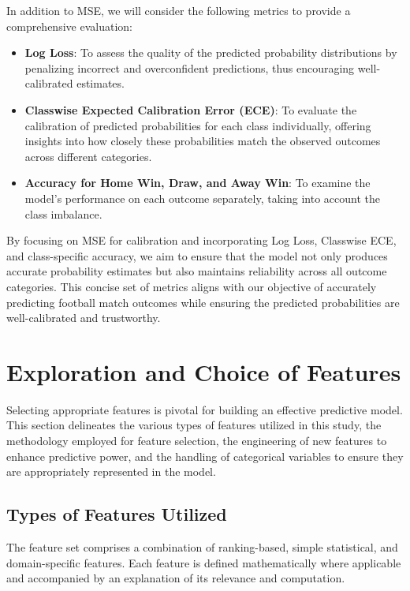 In addition to MSE, we will consider the following metrics to provide a comprehensive evaluation:

\begin{itemize}
    \item \textbf{Log Loss}: To assess the quality of the predicted probability distributions by penalizing incorrect and overconfident predictions, thus encouraging well-calibrated estimates.
    \item \textbf{Classwise Expected Calibration Error (ECE)}: To evaluate the calibration of predicted probabilities for each class individually, offering insights into how closely these probabilities match the observed outcomes across different categories.
    \item \textbf{Accuracy for Home Win, Draw, and Away Win}: To examine the model's performance on each outcome separately, taking into account the class imbalance.
\end{itemize}

By focusing on MSE for calibration and incorporating Log Loss, Classwise ECE, and class-specific accuracy, we aim to ensure that the model not only produces accurate probability estimates but also maintains reliability across all outcome categories. This concise set of metrics aligns with our objective of accurately predicting football match outcomes while ensuring the predicted probabilities are well-calibrated and trustworthy.

\section{Exploration and Choice of Features}
\label{sec:feature_selection}

Selecting appropriate features is pivotal for building an effective predictive model. This section delineates the various types of features utilized in this study, the methodology employed for feature selection, the engineering of new features to enhance predictive power, and the handling of categorical variables to ensure they are appropriately represented in the model. 

\subsection{Types of Features Utilized}
\label{subsec:types_features}

The feature set comprises a combination of ranking-based, simple statistical, and domain-specific features. Each feature is defined mathematically where applicable and accompanied by an explanation of its relevance and computation.

